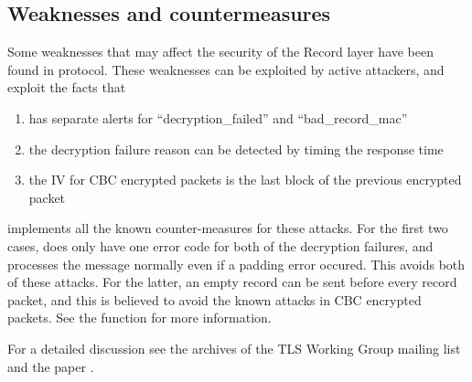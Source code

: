 \subsection{Weaknesses and countermeasures}

Some weaknesses that may affect the security of the Record layer have been
found in \tlsI{} protocol. These weaknesses can be exploited by active attackers,
and exploit the facts that
\begin{enumerate}
\item \tls{} has separate alerts for ``decryption\_failed'' and ``bad\_record\_mac''
\item the decryption failure reason can be detected by timing the response time
\item the IV for CBC encrypted packets is the last block of the previous encrypted packet
\end{enumerate}

\gnutls{} implements all the known counter-measures for these attacks. For the first
two cases, \gnutls{} does only have one error code for both of the decryption failures,
and processes the message normally even if a padding error occured. This avoids
both of these attacks.
For the latter, an empty record can be sent before every record packet, and this is
believed to avoid the known attacks in CBC encrypted packets. See the function
for more information.

For a detailed discussion see the archives of the TLS Working Group mailing list
and the paper \cite{CBCATT}.

